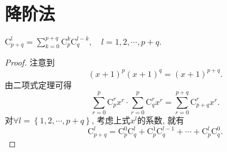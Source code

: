 \documentclass[../../main.tex]{subfiles}
\begin{document}
\section{降阶法}

\begin{theorem}[Vandermode恒等式]\label{theorem:Vandermode恒等式}
$\mathrm{C}_{p+q}^{l}=\sum_{k=0}^{p+q}{\mathrm{C}_{p}^{k}\mathrm{C}_{q}^{l-k}},\quad l=1,2,\cdots,p+q.$
\end{theorem}
\begin{proof}
注意到
\[
\left( x+1 \right) ^p\left( x+1 \right) ^q=\left( x+1 \right) ^{p+q}.
\]
由二项式定理可得
\[
\sum_{r=0}^p{\mathrm{C}_{p}^{r}x^r}\cdot \sum_{r=0}^p{\mathrm{C}_{q}^{r}x^r}=\sum_{r=0}^{p+q}{\mathrm{C}_{p+q}^{r}x^r}.
\]
对$\forall l=\left\{ 1,2,\cdots ,p+q \right\}$, 考虑上式$x^l$的系数, 就有
\[
\mathrm{C}_{p+q}^{l}=\mathrm{C}_{p}^{0}\mathrm{C}_{q}^{l}+\mathrm{C}_{p}^{1}\mathrm{C}_{q}^{l-1}+\cdots +\mathrm{C}_{p}^{l}\mathrm{C}_{q}^{0}.
\]
\end{proof}
\end{document}
